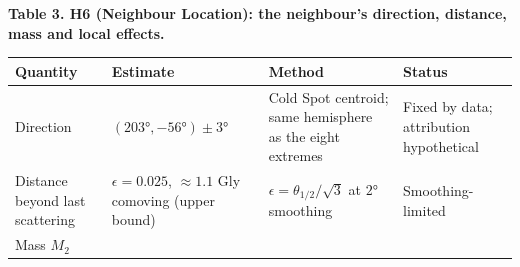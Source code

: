 \documentclass[
]{article}
\begin{document}
\textbf{Table 3. H6 (Neighbour Location): the neighbour's direction,
distance, mass and local effects.}

\begin{longtable}[]{@{}llll@{}}
\toprule
\begin{minipage}[b]{0.22\columnwidth}\raggedright
Quantity\strut
\end{minipage} & \begin{minipage}[b]{0.22\columnwidth}\raggedright
Estimate\strut
\end{minipage} & \begin{minipage}[b]{0.22\columnwidth}\raggedright
Method\strut
\end{minipage} & \begin{minipage}[b]{0.22\columnwidth}\raggedright
Status\strut
\end{minipage}\tabularnewline
\midrule
\endhead
\begin{minipage}[t]{0.22\columnwidth}\raggedright
Direction\strut
\end{minipage} & \begin{minipage}[t]{0.22\columnwidth}\raggedright
\((203°, -56°) \pm 3°\)\strut
\end{minipage} & \begin{minipage}[t]{0.22\columnwidth}\raggedright
Cold Spot centroid; same hemisphere as the eight extremes\strut
\end{minipage} & \begin{minipage}[t]{0.22\columnwidth}\raggedright
Fixed by data; attribution hypothetical\strut
\end{minipage}\tabularnewline
\begin{minipage}[t]{0.22\columnwidth}\raggedright
Distance beyond last scattering\strut
\end{minipage} & \begin{minipage}[t]{0.22\columnwidth}\raggedright
\(\epsilon = 0.025\), \(\approx 1.1\) Gly comoving (upper bound)\strut
\end{minipage} & \begin{minipage}[t]{0.22\columnwidth}\raggedright
\(\epsilon = \theta_{1/2}/\sqrt{3}\) at \(2°\) smoothing\strut
\end{minipage} & \begin{minipage}[t]{0.22\columnwidth}\raggedright
Smoothing-limited\strut
\end{minipage}\tabularnewline
\begin{minipage}[t]{0.22\columnwidth}\raggedright
Mass \(M_2\)\strut
\end{minipage} & \begin{minipage}[t]{0.22\columnwidth}\raggedright

\end{minipage}
\end{longtable}
\end{document}
